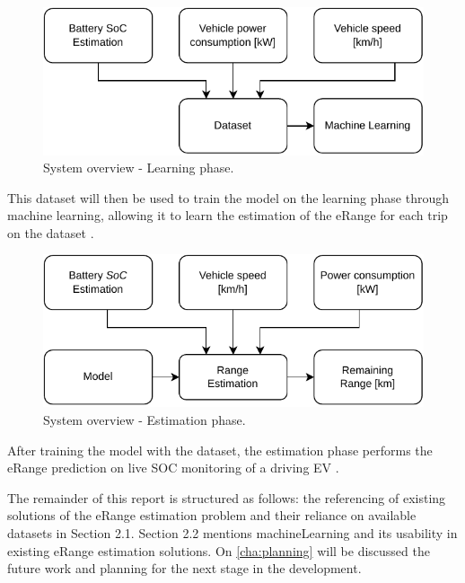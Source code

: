 \begin{figure}[H]
    \begin{center}
        \includegraphics[scale=1.0]{../figures/generic_diagram_learn_phase}
        \caption{System overview - Learning phase.}
        \label{fig:generic_diagram_learn_phase}
    \end{center}
\end{figure}

This \gls{dataset} will then be used to train the model
on the learning phase through machine learning, 
allowing it to learn the estimation of 
the \gls{eRange} for each trip on the \gls{dataset}
.


\begin{figure}[H]
    \begin{center}
        \includegraphics[scale=1.0]{../figures/generic_diagram_estimation_phase}
        \caption{System overview - Estimation phase.}
        \label{fig:generic_diagram_estimation_phase}
    \end{center}
\end{figure}

After training the model with the \gls{dataset},
the estimation phase performs the \gls{eRange} prediction
on live \gls{SOC} monitoring of a driving \gls{EV}
.

The remainder of this report is structured as follows: 
the referencing of existing solutions of the \gls{eRange}
estimation problem and their reliance on available
\gls{dataset}s in Section 2.1. 
Section 2.2 mentions \gls{machineLearning} and its 
usability in existing \gls{eRange} estimation solutions.
On \ref{cha:planning} will be discussed the future work and
planning for the next stage in the development. 